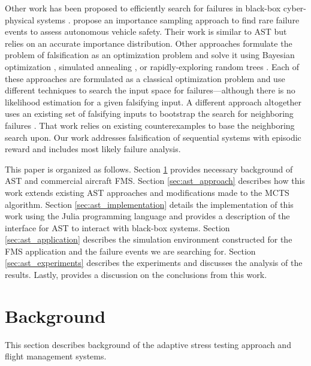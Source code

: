 Other work has been proposed to efficiently search for failures in black-box cyber-physical systems \cite{corso2020survey}. \citeauthor*{trustworthy_ai} propose an importance sampling approach to find rare failure events to assess autonomous vehicle safety.
Their work is similar to AST but relies on an accurate importance distribution.
Other approaches formulate the problem of falsification as an optimization problem and solve it using Bayesian optimization \cite{bayes_opt}, simulated annealing \cite{abbas2013probabilistic,aerts2018temporal}, or rapidly-exploring random trees  \cite{rrts}.
Each of these approaches are formulated as a classical optimization problem and use different techniques to search the input space for failures---although there is no likelihood estimation for a given falsifying input.
A different approach altogether uses an existing set of falsifying inputs to bootstrap the search for neighboring failures \cite{bootstrap}.
That work relies on existing counterexamples to base the neighboring search upon.
Our work addresses falsification of sequential systems with episodic reward and includes most likely failure analysis.




This paper is organized as follows. 
Section \ref{sec:ast_background} provides necessary background of AST and commercial aircraft FMS. Section \ref{sec:ast_approach} describes how this work extends existing AST approaches and modifications made to the MCTS algorithm. Section \ref{sec:ast_implementation} details the implementation of this work using the Julia programming language and provides a description of the interface for AST to interact with black-box systems. Section \ref{sec:ast_application} describes the simulation environment constructed for the FMS application and the failure events we are searching for. Section \ref{sec:ast_experiments} describes the experiments and discusses the analysis of the results. Lastly,  provides a discussion on the conclusions from this work.




\section{Background} \label{sec:ast_background}
This section describes background of the adaptive stress testing approach and flight management systems.

